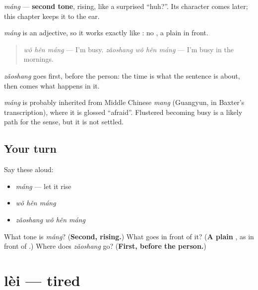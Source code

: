 \begin{sounds}
\emph{máng} — \textbf{second tone}, rising, like a surprised \textquotedblleft{}huh?\textquotedblright{}. Its character comes later; this chapter keeps it to the ear.
\end{sounds}

\begin{grammarlens}[title={Grammar Lens: the same shape as \zh{我很好}}]
\emph{máng} is an adjective, so it works exactly like : no , a plain  in front.

\begin{quote}
\emph{wǒ hěn máng} — I'm busy. \emph{zǎoshang wǒ hěn máng} — I'm busy in the mornings.
\end{quote}

\emph{zǎoshang} goes first, before the person: the time is what the sentence is about, then comes what happens in it.
\end{grammarlens}

\begin{cousinweb}
\emph{máng} is probably inherited from Middle Chinese \emph{mang} (Guangyun, in Baxter's transcription), where it is glossed \textquotedblleft{}afraid\textquotedblright{}. Flustered becoming busy is a likely path for the sense, but it is not settled.
\end{cousinweb}

\subsection*{Your turn}
Say these aloud:

\begin{itemize}
\raggedright
  \item \emph{máng} — let it rise
  \item \emph{wǒ hěn máng}
  \item \emph{zǎoshang wǒ hěn máng}
\end{itemize}

\begin{tcolorbox}[breakable,colback=teal!4,colframe=teal!35!black,title={Before you move on}]
What tone is \emph{máng}? (\textbf{Second, rising.}) What goes in front of it? (\textbf{A plain }, as in front of .) Where does \emph{zǎoshang} go? (\textbf{First, before the person.})
\end{tcolorbox}
\section[lèi]{lèi — tired}

